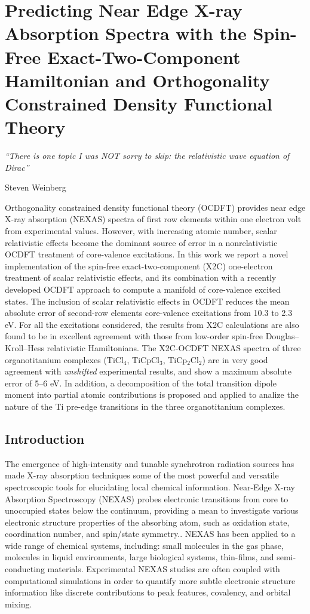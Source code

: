 \documentclass{article}
\begin{document}
\chapter{Predicting Near Edge X-ray Absorption Spectra with the Spin-Free Exact-Two-Component Hamiltonian and Orthogonality Constrained Density Functional Theory}
\epigraph{\textit{``There is one topic I was NOT sorry to skip: the relativistic wave equation of Dirac''}}{Steven Weinberg}
\begin{chapabstract}
Orthogonality constrained density functional theory (OCDFT) provides near edge X-ray absorption (NEXAS) spectra of first row elements within one electron volt from experimental values.
However, with increasing atomic number, scalar relativistic effects become the dominant source of error in a nonrelativistic OCDFT treatment of core-valence excitations.
In this work we report a novel implementation of the spin-free exact-two-component (X2C) one-electron treatment of scalar relativistic effects, and its combination with a recently developed OCDFT approach to compute a manifold of core-valence excited states.
The inclusion of scalar relativistic effects in OCDFT reduces the mean absolute error of second-row elements core-valence excitations from 10.3 to 2.3 eV.
For all the excitations considered, the results from X2C calculations are also found to be in excellent agreement with those from low-order spin-free Douglas--Kroll--Hess relativistic Hamiltonians.
The X2C-OCDFT NEXAS spectra of three organotitanium complexes (TiCl$_4$, TiCpCl$_3$, TiCp$_2$Cl$_2$) are in very good agreement with \textit{unshifted} experimental results, and show a maximum absolute error of 5--6 eV.
In addition, a decomposition of the total transition dipole moment into partial atomic contributions is proposed and applied to analize the nature of the Ti pre-edge transitions in the three organotitanium complexes.
\end{chapabstract}
\section{Introduction}
The emergence of high-intensity and tunable synchrotron radiation sources has made X-ray absorption techniques some of the most powerful and versatile spectroscopic tools for elucidating local chemical information. Near-Edge X-ray Absorption Spectroscopy (NEXAS) probes electronic transitions from core to unoccupied states below the continuum,\cite{stohr_nexafs} providing a mean to investigate various electronic structure properties of the absorbing atom, such as oxidation state, coordination number, and spin/state symmetry.\cite{Use-NEXAS,NEXAF-use-covant,NEXAFS-oxidation,C2CY00343K}. NEXAS has been applied to a wide range of chemical systems, including: small molecules in the gas phase\cite{small-molecule}, molecules in liquid environments,\cite{Wernet2004,Freiwald2004} large biological systems\cite{Hans-DNA}, thin-films\cite{review-XAS}, and semi-conducting materials\cite{Semi-conductor}. Experimental NEXAS studies are often coupled with computational simulations in order to quantify more subtle electronic structure information like discrete contributions to peak features, covalency, and orbital mixing. \cite{Milne-review,stohr_nexafs,C2CY00343K,NEXAF-use-covant,B926499J}
\end{document}
